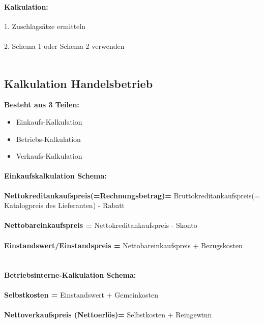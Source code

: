 \documentclass[../ZF_Wing.tex]{subfiles}
\begin{document}
\paragraph{Kalkulation:\\}
1. Zuschlagsätze ermitteln\\
\\
2. Schema 1 oder Schema 2 verwenden\\
\\

\subsection{Kalkulation Handelsbetrieb}

\textbf{Besteht aus 3 Teilen:}
\begin{itemize}
	\item Einkaufs-Kalkulation
	\item Betriebs-Kalkulation
	\item Verkaufs-Kalkulation
\end{itemize}


\paragraph{\colorbox{orange!30}{Einkaufskalkulation Schema:}\\}

\textbf{Nettokreditankaufspreis(=Rechnungsbetrag)=} Bruttokreditankaufspreis(= Katalogpreis des Lieferanten) - Rabatt\\
\\
\textbf{Nettobareinkaufspreis =} Nettokreditankaufspreis - Skonto\\
\\
\textbf{Einstandswert/Einstandspreis =} Nettobareinkaufspreis + Bezugskosten\\
\\


\paragraph{\colorbox{orange!30}{Betriebsinterne-Kalkulation Schema:}\\}

\textbf{Selbstkosten = } Einstandswert + Gemeinkosten\\
\\
\textbf{Nettoverkaufspreis (Nettoerlös)=} Selbstkosten + Reingewinn\\
\\
\end{document}
